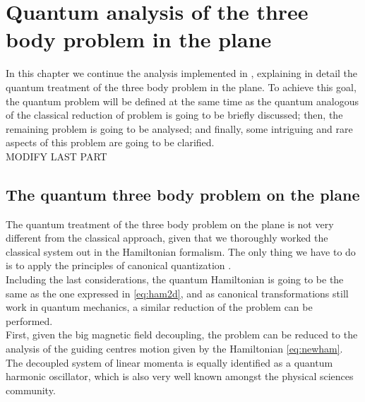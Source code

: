 \chapter{Quantum analysis of the three body problem in the plane}
In this chapter we continue the analysis implemented in \cite{alonso}, explaining in detail the quantum treatment of the three body problem in the plane. To achieve this goal, the quantum problem will be defined at the same time as the quantum analogous of the classical reduction of problem is going to be briefly discussed; then, the remaining problem is going to be analysed; and finally, some intriguing and rare aspects of this problem are going to be clarified.\\

MODIFY LAST PART
\section{The quantum three body problem on the plane}
The quantum treatment of the three body problem on the plane is not very different from the classical approach, given that we thoroughly worked the classical system out in the Hamiltonian formalism. The only thing we have to do is to apply the principles of canonical quantization \cite{Canonical quantization}. \\

Including the last considerations, the quantum Hamiltonian is going to be the same as the one expressed in \eqref{eq:ham2d}, and as canonical transformations still work in quantum mechanics, a similar reduction of the problem can be performed.\\


First, given the big magnetic field decoupling, the problem can be reduced to the analysis of the guiding centres motion given by the Hamiltonian \eqref{eq:newham}. The decoupled system of linear momenta is equally identified as a quantum harmonic oscillator, which is also very well known amongst the physical sciences community.\\

